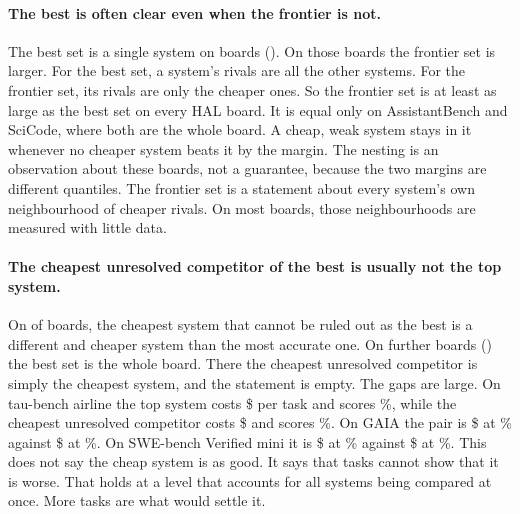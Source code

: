 \documentclass[11pt]{article}
\begin{document}
\paragraph{The best is often clear even when the frontier is not.}
The best set is a single system on \NumHalBoardsBestOne{} boards (\NumHalBoardsBestOneNames). On those boards the frontier set is larger. For the best set, a system's rivals are all the other systems. For the frontier set, its rivals are only the cheaper ones. So the frontier set is at least as large as the best set on every HAL board. It is equal only on AssistantBench and SciCode, where both are the whole board. A cheap, weak system stays in it whenever no cheaper system beats it by the margin. The nesting is an observation about these boards, not a guarantee, because the two margins are different quantiles. The frontier set is a statement about every system's own neighbourhood of cheaper rivals. On most boards, those neighbourhoods are measured with little data.

\paragraph{The cheapest unresolved competitor of the best is usually not the top system.}
On \NumHalBoardsCheaperBestInformative{} of \NumHalBoards{} boards, the cheapest system that cannot be ruled out as the best is a different and cheaper system than the most accurate one. On \NumHalBoardsBestAll{} further boards (\NumHalBoardsSetAllNames) the best set is the whole board. There the cheapest unresolved competitor is simply the cheapest system, and the statement is empty. The gaps are large. On tau-bench airline the top system costs \$\NumTaubenchAirlineTopCost{} per task and scores \NumTaubenchAirlineTopAcc\%, while the cheapest unresolved competitor costs \$\NumTaubenchAirlineCbCost{} and scores \NumTaubenchAirlineCbAcc\%. On GAIA the pair is \$\NumGaiaTopCost{} at \NumGaiaTopAcc\% against \$\NumGaiaCbCost{} at \NumGaiaCbAcc\%. On SWE-bench Verified mini it is \$\NumSwebenchVerifiedMiniTopCost{} at \NumSwebenchVerifiedMiniTopAcc\% against \$\NumSwebenchVerifiedMiniCbCost{} at \NumSwebenchVerifiedMiniCbAcc\%. This does not say the cheap system is as good. It says that \NumTaubenchAirlineTasks{} tasks cannot show that it is worse. That holds at a level that accounts for all \NumTaubenchAirlineSystems{} systems being compared at once. More tasks are what would settle it.
\end{document}
